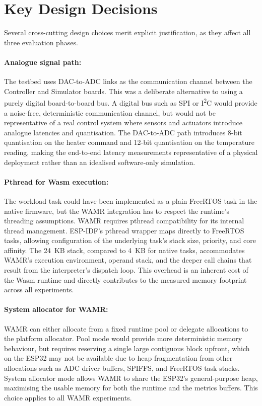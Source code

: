 \documentclass[12pt, a4paper]{report}
\begin{document}
\section{Key Design Decisions}
\label{sec:design-decisions}

Several cross-cutting design choices merit explicit justification, as they affect all three evaluation phases.

\paragraph{Analogue signal path:} The testbed uses DAC-to-ADC links as the communication channel between the Controller and Simulator boards. This was a deliberate alternative to using a purely digital board-to-board bus. A digital bus such as SPI or I\textsuperscript{2}C would provide a noise-free, deterministic communication channel, but would not be representative of a real control system where sensors and actuators introduce analogue latencies and quantisation. The DAC-to-ADC path introduces 8-bit quantisation on the heater command and 12-bit quantisation on the temperature reading, making the end-to-end latency measurements representative of a physical deployment rather than an idealised software-only simulation.

\paragraph{Pthread for Wasm execution:} The workload task could have been implemented as a plain FreeRTOS task in the native firmware, but the WAMR integration has to respect the runtime's threading assumptions. WAMR requires pthread compatibility for its internal thread management. ESP-IDF's pthread wrapper maps directly to FreeRTOS tasks, allowing configuration of the underlying task's stack size, priority, and core affinity. The 24~KB stack, compared to 4~KB for native tasks, accommodates WAMR's execution environment, operand stack, and the deeper call chains that result from the interpreter's dispatch loop. This overhead is an inherent cost of the Wasm runtime and directly contributes to the measured memory footprint across all experiments.

\paragraph{System allocator for WAMR:} WAMR can either allocate from a fixed runtime pool or delegate allocations to the platform allocator. Pool mode would provide more deterministic memory behaviour, but requires reserving a single large contiguous block upfront, which on the ESP32 may not be available due to heap fragmentation from other allocations such as ADC driver buffers, SPIFFS, and FreeRTOS task stacks. System allocator mode allows WAMR to share the ESP32's general-purpose heap, maximising the usable memory for both the runtime and the metrics buffers. This choice applies to all WAMR experiments.
\end{document}
